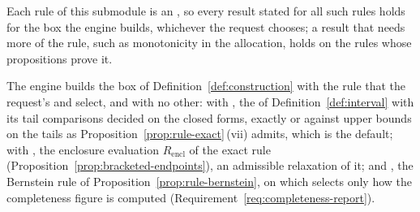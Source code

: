 
Each rule of this submodule is an , so every
result stated for all such rules holds for the box the engine builds,
whichever the request chooses; a result that needs more of the rule, such as
monotonicity in the allocation, holds on the rules whose propositions prove
it.

\begin{requirement}\label{req:rule-in-force}
The engine builds the box of Definition~\ref{def:construction} with the rule
that the request's  and  select,
and with no other:  with
, the  of
Definition~\ref{def:interval} with its tail comparisons decided on the
closed forms, exactly or against upper bounds on the tails as
Proposition~\ref{prop:rule-exact}\,(vii) admits, which is the default;  with
, the enclosure evaluation
$R_{\mathrm{encl}}$ of the exact rule
(Proposition~\ref{prop:bracketed-endpoints}), an admissible relaxation of it;
and , the Bernstein rule of
Proposition~\ref{prop:rule-bernstein}, on which 
selects only how the completeness figure is computed
(Requirement~\ref{req:completeness-report}).
\end{requirement}
